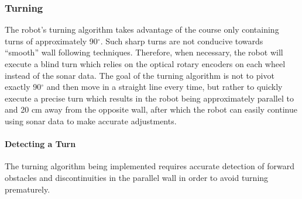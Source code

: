 \begin{figure}[h!]
\centering
\cprotect {}
\end{figure}



\subsubsection{Turning}
The robot's turning algorithm takes advantage of the course only containing turns of approximately 90\(^\circ\). Such sharp turns
are not conducive towards ``smooth'' wall following techniques.
Therefore, when necessary, the robot will execute a blind turn which relies on the
optical rotary encoders on each wheel instead of the sonar data.
The goal of the turning algorithm is not to pivot exactly 90\(^\circ\)
and then move in a straight line every time, but rather to quickly execute a precise turn which results
in the robot being approximately parallel to and 20 cm away from the
opposite wall, after which the robot can easily continue using sonar
data to make accurate adjustments.

\paragraph{Detecting a Turn}
The turning algorithm being implemented requires accurate detection of
forward obstacles and discontinuities in the parallel wall in order to
avoid turning prematurely.

